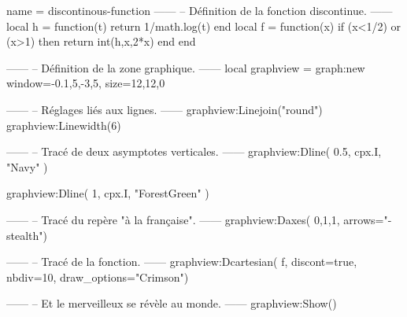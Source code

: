 \documentclass[border = 3pt]{standalone}
\begin{document}
\begin{luadraw}{name = discontinous-function}
------
-- Définition de la fonction discontinue.
------
    local h = function(t) return 1/math.log(t) end
    local f = function(x) if (x<1/2) or (x>1) then return int(h,x,2*x) end end

------
-- Définition de la zone graphique.
------
    local graphview = graph:new{
        window={-0.1,5,-3,5},
        size={12,12,0}
    }

------
-- Réglages liés aux lignes.
------
    graphview:Linejoin("round")
    graphview:Linewidth(6)

------
-- Tracé de deux asymptotes verticales.
------
    graphview:Dline(
        {0.5, cpx.I},
        "Navy"
    )

    graphview:Dline(
        {1, cpx.I},
        "ForestGreen"
    )

------
-- Tracé du repère "à la française".
------
    graphview:Daxes(
        {0,1,1},
        {arrows="-stealth"})

------
-- Tracé de la fonction.
------
    graphview:Dcartesian(
        f,
        {
            discont=true,
            nbdiv=10,
            draw_options="Crimson"})

------
-- Et le merveilleux se révèle au monde.
------
    graphview:Show()
\end{luadraw}
\end{document}
